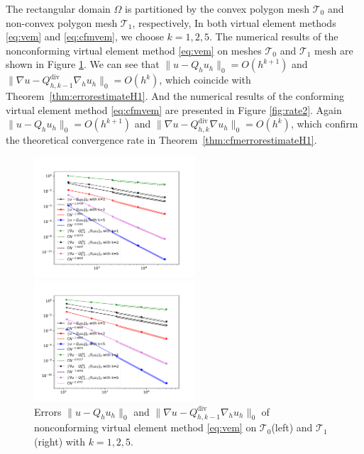 \documentclass[10pt]{amsart}
\renewcommand{\div}{\operatorname{div}}
\numberwithin{equation}{section}
\begin{document}
The rectangular domain $\Omega$ is partitioned by the convex polygon mesh
$\mathcal T_0$ and non-convex polygon mesh $\mathcal T_1$, respectively, 
In both virtual element methods \eqref{eq:vem} and \eqref{eq:cfmvem}, we choose $k = 1, 2, 5$.
The numerical results of the nonconforming virtual element method \eqref{eq:vem} on meshes $\mathcal T_0$ and $\mathcal T_1$ mesh are shown in Figure \ref{fig:rate1}. We can see that $\|u - Q_h u_h\|_0=O(h^{k+1})$ and $\|\nabla u - Q_{h, k-1}^{\div}\nabla_h u_h\|_0=O(h^{k})$, which coincide with Theorem~\ref{thm:errorestimateH1}.
And the numerical results of the conforming virtual element method \eqref{eq:cfmvem} are presented in Figure \ref{fig:rate2}. Again $\|u - Q_h u_h\|_0=O(h^{k+1})$ and $\|\nabla u - Q_{h, k}^{\div}\nabla u_h\|_0=O(h^{k})$, which confirm the
theoretical convergence rate in Theorem~\ref{thm:cfmerrorestimateH1}.
\begin{figure}[htbp]
\centering
\begin{minipage}[t]{0.49\linewidth}
\centering
\includegraphics[width=6cm]{./figures/ncvem_convex.pdf}
\end{minipage}%
\begin{minipage}[t]{0.49\linewidth}
\centering
\includegraphics[width=6cm]{./figures/ncvem_nonconvex.pdf}
\end{minipage}%
\centering
\caption{Errors $\|u - Q_h u_h\|_0$ and $\|\nabla u - Q_{h, k-1}^{\div}\nabla_h u_h\|_0$ 
of nonconforming virtual element method \eqref{eq:vem} on 
$\mathcal T_0$(left) and $\mathcal T_1$(right) with $k=1, 2, 5$.}
\label{fig:rate1}
\end{figure}
\end{document}
